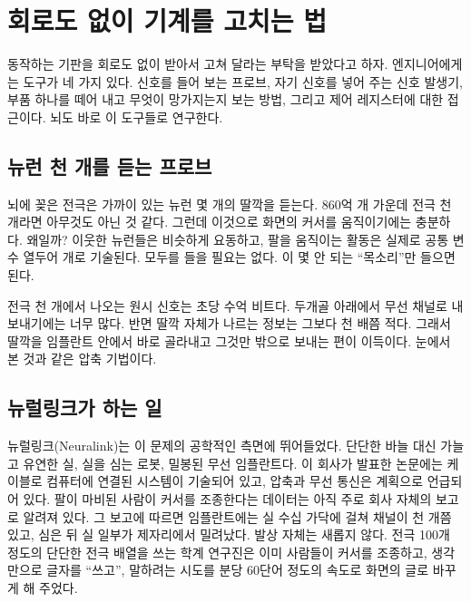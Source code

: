 \chapter{회로도 없이 기계를 고치는 법}


동작하는 기판을 회로도 없이 받아서 고쳐 달라는 부탁을 받았다고 하자. 엔지니어에게는 도구가 네 가지 있다. 신호를 들어 보는 프로브, 자기 신호를 넣어 주는 신호 발생기, 부품 하나를 떼어 내고 무엇이 망가지는지 보는 방법, 그리고 제어 레지스터에 대한 접근이다. 뇌도 바로 이 도구들로 연구한다.

\section*{뉴런 천 개를 듣는 프로브}

뇌에 꽂은 전극은 가까이 있는 뉴런 몇 개의 딸깍을 듣는다. 860억 개 가운데 전극 천 개라면 아무것도 아닌 것 같다. 그런데 이것으로 화면의 커서를 움직이기에는 충분하다. 왜일까? 이웃한 뉴런들은 비슷하게 요동하고, 팔을 움직이는 활동은 실제로 공통 변수 열두어 개로 기술된다. 모두를 들을 필요는 없다. 이 몇 안 되는 “목소리”만 들으면 된다.

전극 천 개에서 나오는 원시 신호는 초당 수억 비트다. 두개골 아래에서 무선 채널로 내보내기에는 너무 많다. 반면 딸깍 자체가 나르는 정보는 그보다 천 배쯤 적다. 그래서 딸깍을 임플란트 안에서 바로 골라내고 그것만 밖으로 보내는 편이 이득이다. 눈에서 본 것과 같은 압축 기법이다.

\section*{뉴럴링크가 하는 일}

뉴럴링크(Neuralink)는 이 문제의 공학적인 측면에 뛰어들었다. 단단한 바늘 대신 가늘고 유연한 실, 실을 심는 로봇, 밀봉된 무선 임플란트다. 이 회사가 발표한 논문에는 케이블로 컴퓨터에 연결된 시스템이 기술되어 있고, 압축과 무선 통신은 계획으로 언급되어 있다. 팔이 마비된 사람이 커서를 조종한다는 데이터는 아직 주로 회사 자체의 보고로 알려져 있다. 그 보고에 따르면 임플란트에는 실 수십 가닥에 걸쳐 채널이 천 개쯤 있고, 심은 뒤 실 일부가 제자리에서 밀려났다. 발상 자체는 새롭지 않다. 전극 100개 정도의 단단한 전극 배열을 쓰는 학계 연구진은 이미 사람들이 커서를 조종하고, 생각만으로 글자를 “쓰고”, 말하려는 시도를 분당 60단어 정도의 속도로 화면의 글로 바꾸게 해 주었다.

